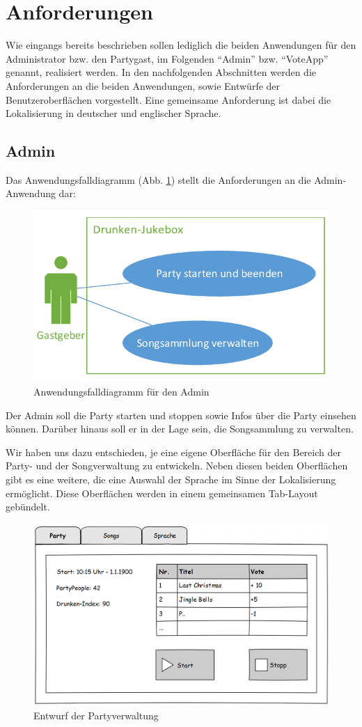 \section{Anforderungen}
\label{sec:Anforderungen}
Wie eingangs bereits beschrieben sollen lediglich die beiden Anwendungen für den Administrator bzw. den Partygast, im Folgenden "`Admin"' bzw. "`VoteApp"' genannt, realisiert werden. In den nachfolgenden Abschnitten werden die Anforderungen an die beiden Anwendungen, sowie Entwürfe der Benutzeroberflächen vorgestellt. Eine gemeinsame Anforderung ist dabei die Lokalisierung in deutscher und englischer Sprache.

\subsection{Admin}
Das Anwendungsfalldiagramm (Abb. \ref{fig:AdminUseCase}) stellt die Anforderungen an die Admin-Anwendung dar:

\begin{figure}[H]
\centering
\includegraphics[width=0.7\linewidth]{Bilder/AdminUseCase}
\caption{Anwendungsfalldiagramm für den Admin}
\label{fig:AdminUseCase}
\end{figure}

Der Admin soll die Party starten und stoppen sowie Infos über die Party einsehen können. Darüber hinaus soll er in der Lage sein, die Songsammlung zu verwalten.

Wir haben uns dazu entschieden, je eine eigene Oberfläche für den Bereich der Party- und der Songverwaltung zu entwickeln. Neben diesen beiden Oberflächen gibt es eine weitere, die eine Auswahl der Sprache im Sinne der Lokalisierung ermöglicht. Diese Oberflächen werden in einem gemeinsamen Tab-Layout gebündelt.
  
\begin{figure}[H]
\centering
\includegraphics[width=0.85\linewidth]{Bilder/MockParty}
\caption{Entwurf der Partyverwaltung}
\label{fig:MockParty}
\end{figure}

